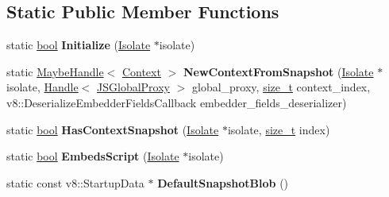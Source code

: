 \subsection*{Static Public Member Functions}
\begin{DoxyCompactItemize}
\item 
\mbox{\label{classv8_1_1internal_1_1Snapshot_a5054ae7a1ee4b2db6052099fbbddb401}} 
static \mbox{\hyperlink{classbool}{bool}} {\bfseries Initialize} (\mbox{\hyperlink{classv8_1_1internal_1_1Isolate}{Isolate}} $\ast$isolate)
\item 
\mbox{\label{classv8_1_1internal_1_1Snapshot_a27a66d2b0f7d680711bc8208a09fa77e}} 
static \mbox{\hyperlink{classv8_1_1internal_1_1MaybeHandle}{Maybe\+Handle}}$<$ \mbox{\hyperlink{classv8_1_1internal_1_1Context}{Context}} $>$ {\bfseries New\+Context\+From\+Snapshot} (\mbox{\hyperlink{classv8_1_1internal_1_1Isolate}{Isolate}} $\ast$isolate, \mbox{\hyperlink{classv8_1_1internal_1_1Handle}{Handle}}$<$ \mbox{\hyperlink{classv8_1_1internal_1_1JSGlobalProxy}{J\+S\+Global\+Proxy}} $>$ global\+\_\+proxy, \mbox{\hyperlink{classsize__t}{size\+\_\+t}} context\+\_\+index, v8\+::\+Deserialize\+Embedder\+Fields\+Callback embedder\+\_\+fields\+\_\+deserializer)
\item 
\mbox{\label{classv8_1_1internal_1_1Snapshot_a8792603b1bdff6535d4cb0b0034d82b8}} 
static \mbox{\hyperlink{classbool}{bool}} {\bfseries Has\+Context\+Snapshot} (\mbox{\hyperlink{classv8_1_1internal_1_1Isolate}{Isolate}} $\ast$isolate, \mbox{\hyperlink{classsize__t}{size\+\_\+t}} index)
\item 
\mbox{\label{classv8_1_1internal_1_1Snapshot_a3a1aebec9d95ea0ab6934cca5ce3a9af}} 
static \mbox{\hyperlink{classbool}{bool}} {\bfseries Embeds\+Script} (\mbox{\hyperlink{classv8_1_1internal_1_1Isolate}{Isolate}} $\ast$isolate)
\item 
\mbox{\label{classv8_1_1internal_1_1Snapshot_a5581dcad3c8aebccb9e9ad5fd641cf03}} 
static const v8\+::\+Startup\+Data $\ast$ {\bfseries Default\+Snapshot\+Blob} ()
\item 
\mbox{\label{classv8_1_1internal_1_1Snapshot_ad186fe56fe8f495f0aabd8bdb2b658c4}} 

\end{DoxyCompactItemize}

